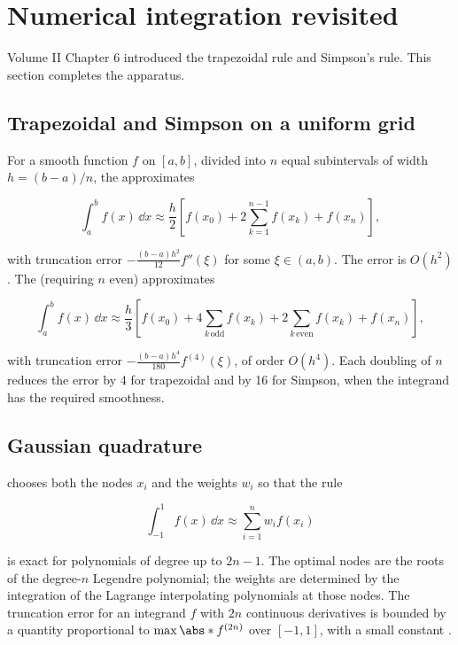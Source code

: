 \section{Numerical integration revisited}

Volume II Chapter 6 introduced the trapezoidal rule and Simpson's
rule. This section completes the apparatus.

\subsection{Trapezoidal and Simpson on a uniform grid}

For a smooth function $f$ on $[a, b]$, divided into $n$ equal
subintervals of width $h = (b - a)/n$, the  approximates

\[
\int_{a}^{b} f(x)\, \dd x \approx \frac{h}{2}\!\left[f(x_{0}) +
2 \sum_{k=1}^{n-1} f(x_{k}) + f(x_{n})\right],
\]

with truncation error $-\frac{(b-a)h^{2}}{12} f''(\xi)$ for some
$\xi \in (a, b)$. The error is $O(h^{2})$. The  (requiring $n$ even) approximates

\[
\int_{a}^{b} f(x)\, \dd x \approx \frac{h}{3}\!\left[f(x_{0}) +
4 \sum_{k\, \mathrm{odd}} f(x_{k}) + 2 \sum_{k\, \mathrm{even}}
f(x_{k}) + f(x_{n})\right],
\]

with truncation error $-\frac{(b-a)h^{4}}{180} f^{(4)}(\xi)$, of
order $O(h^{4})$. Each doubling of $n$ reduces the error by 4 for
trapezoidal and by 16 for Simpson, when the integrand has the
required smoothness.

\subsection{Gaussian quadrature}

 chooses both the nodes $x_{i}$ and
the weights $w_{i}$ so that the rule

\[
\int_{-1}^{1} f(x)\, \dd x \approx \sum_{i=1}^{n} w_{i} f(x_{i})
\]

is exact for polynomials of degree up to $2n - 1$. The optimal
nodes are the roots of the degree-$n$ Legendre polynomial; the
weights are determined by the integration of the Lagrange
interpolating polynomials at those nodes. The truncation error
for an integrand $f$ with $2n$ continuous derivatives is bounded
by a quantity proportional to $\max\abs*{f^{(2n)}}$ over $[-1,
1]$, with a small constant
\cite[ch.~10]{text:moler-numerical}.

